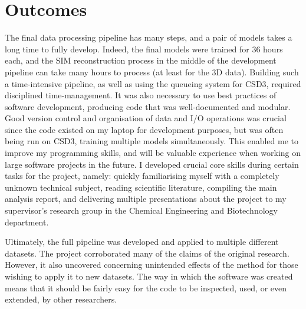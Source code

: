 \documentclass[12pt]{article}
\begin{document}
\section*{Outcomes}

The final data processing pipeline has many steps,
and a pair of models takes a long time to fully develop.
Indeed, the final models were trained for 36 hours each,
and the SIM reconstruction process in the middle of the development pipeline can take many hours to process (at least for the 3D data).
Building such a time-intensive pipeline, as well as using the queueing system for CSD3, required disciplined time-management.
It was also necessary to use best practices of software development, producing code that was well-documented and modular.
Good version control and organisation of data and I/O operations was crucial since the code existed on my laptop for development purposes,
but was often being run on CSD3, training multiple models simultaneously.
This enabled me to improve my programming skills, and will be valuable experience when working on large software projects in the future.
I developed crucial core skills during certain tasks for the project, namely:
quickly familiarising myself with a completely unknown technical subject,
reading scientific literature,
compiling the main analysis report,
and delivering multiple presentations about the project to my supervisor's research group in the Chemical Engineering and Biotechnology department.

Ultimately, the full pipeline was developed and applied to multiple different datasets.
The project corroborated many of the claims of the original research.
However, it also uncovered concerning unintended effects of the method for those wishing to apply it to new datasets.
The way in which the software was created means that it should be fairly easy for the code to be inspected,
used, or even extended, by other researchers.

\newpage



\end{document}

